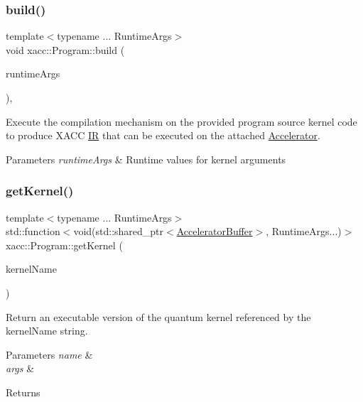 \subsubsection{\texorpdfstring{build()}{build()}}
{\footnotesize\ttfamily template$<$typename ... Runtime\+Args$>$ \\
void xacc\+::\+Program\+::build (\begin{DoxyParamCaption}\item[{Runtime\+Args ...}]{runtime\+Args }\end{DoxyParamCaption})\hspace{0.3cm}{\ttfamily [inline]}, {\ttfamily [protected]}}

Execute the compilation mechanism on the provided program source kernel code to produce X\+A\+CC \hyperlink{a02480}{IR} that can be executed on the attached \hyperlink{a02432}{Accelerator}.


\begin{DoxyParams}{Parameters}
{\em runtime\+Args} & Runtime values for kernel arguments \\
\hline
\end{DoxyParams}
\mbox{\label{a02488_abf5023c9f01cac8a506bdef86760e8f1}} 
\subsubsection{\texorpdfstring{get\+Kernel()}{getKernel()}}
{\footnotesize\ttfamily template$<$typename ... Runtime\+Args$>$ \\
std\+::function$<$void(std\+::shared\+\_\+ptr$<$\hyperlink{a02444}{Accelerator\+Buffer}$>$, Runtime\+Args...)$>$ xacc\+::\+Program\+::get\+Kernel (\begin{DoxyParamCaption}\item[{const std\+::string \&}]{kernel\+Name }\end{DoxyParamCaption})\hspace{0.3cm}{\ttfamily [inline]}}

Return an executable version of the quantum kernel referenced by the kernel\+Name string.


\begin{DoxyParams}{Parameters}
{\em name} & \\
\hline
{\em args} & \\
\hline
\end{DoxyParams}
\begin{DoxyReturn}{Returns}

\end{DoxyReturn}


